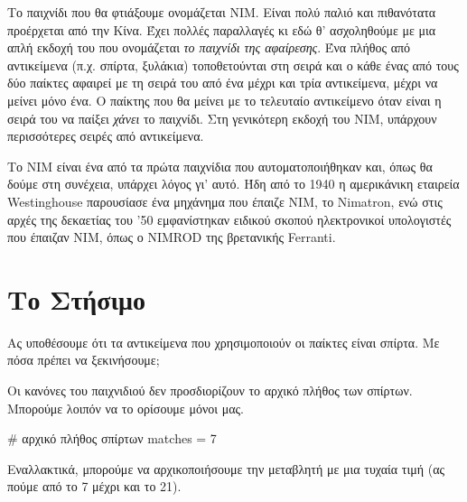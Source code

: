 \documentclass[a4paper,11pt,oneside]{book}
\begin{document}

Το παιχνίδι που θα φτιάξουμε ονομάζεται ΝΙΜ. Είναι πολύ παλιό και πιθανότατα προέρχεται από την Κίνα. Έχει πολλές παραλλαγές κι εδώ θ' ασχοληθούμε με μια απλή εκδοχή του που ονομάζεται \emph{το παιχνίδι της αφαίρεσης}. Ένα πλήθος από αντικείμενα (π.χ. σπίρτα, ξυλάκια) τοποθετούνται στη σειρά και ο κάθε ένας από τους δύο παίκτες αφαιρεί με τη σειρά του από ένα μέχρι και τρία αντικείμενα, μέχρι να μείνει μόνο ένα. Ο παίκτης που θα μείνει με το τελευταίο αντικείμενο όταν είναι η σειρά του να παίξει \emph{χάνει} το παιχνίδι. Στη γενικότερη εκδοχή του ΝΙΜ, υπάρχουν περισσότερες σειρές από αντικείμενα.

Το ΝΙΜ είναι ένα από τα πρώτα παιχνίδια που αυτοματοποιήθηκαν και, όπως θα δούμε στη συνέχεια, υπάρχει λόγος γι' αυτό. Ήδη από το 1940 η αμερικάνικη εταιρεία Westinghouse παρουσίασε ένα μηχάνημα που έπαιζε ΝΙΜ, το Nimatron, ενώ στις αρχές της δεκαετίας του '50 εμφανίστηκαν ειδικού σκοπού ηλεκτρονικοί υπολογιστές που έπαιζαν ΝΙΜ, όπως ο NIMROD της βρετανικής Ferranti.


\section{Το Στήσιμο}

\begin{question}
Ας υποθέσουμε ότι τα αντικείμενα που χρησιμοποιούν οι παίκτες είναι σπίρτα. Με πόσα πρέπει να ξεκινήσουμε;
\end{question}

Οι κανόνες του παιχνιδιού δεν προσδιορίζουν το αρχικό πλήθος των σπίρτων. Μπορούμε λοιπόν να το ορίσουμε μόνοι μας.

\begin{pycode}
# αρχικό πλήθος σπίρτων
matches = 7
\end{pycode}

Εναλλακτικά, μπορούμε να αρχικοποιήσουμε την μεταβλητή  με μια τυχαία τιμή (ας πούμε από το 7 μέχρι και το 21).
\end{document}
